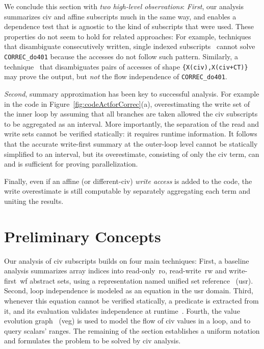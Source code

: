 \documentclass[10pt,nocopyrightspace]{sigplanconf}
\begin{document}
\vspace{1ex}
We conclude this section with {\em two high-level observations}: %
{\em First}, our analysis summarizes {\sc civ} and affine subscripts
much in the same way, and enables a dependence test that is agnostic
to the kind of subscripts that were used.
%
These properties do not seem to hold for related approaches: 
For example, techniques that disambiguate consecutively written,
single indexed subscripts~\cite{PaduaDemDrInterproc,VEG} cannot solve
{\tt CORREC\_do401} because the accesses do not follow such pattern.
Similarly, a technique~\cite{CohenBeyondMon} that disambiguates 
pairs of accesses of shape {\tt \{X(civ),X(civ+CT)\}} may prove the output,
but {\em not} the flow independence of {\tt CORREC\_do401}. 
%


{\em Second}, summary approximation has been key to successful
analysis. For example in the code in Figure~\ref{fig:codeActforCorrec}(a), 
overestimating the write set of the inner loop by assuming that all 
branches are taken allowed the {\sc civ} subscripts to be aggregated
as an interval. 
More importantly, the separation of the read and write sets cannot 
be verified statically: it requires runtime information. 
%
It follows that the accurate write-first summary at the 
outer-loop level cannot be statically simplified to an interval,
but its overestimate, consisting of only the {\sc civ} term, 
can and is sufficient for proving parallelization.

Finally, even if an affine (or different-{\sc civ})
{\em write access} is added to the code, the write overestimate
is still computable by separately aggregating each term and 
uniting the results.


\section{Preliminary Concepts}
\label{subsec:Background}


Our analysis of {\sc civ} subscripts builds on four main techniques: 
%
First, a baseline analysis summarizes array indices into read-only~{\sc ro}, 
read-write~{\sc rw} and write-first~{\sc wf} abstract sets, using a 
representation named unified set reference~\cite{HybAn} ({\sc usr}).
%
Second, loop independence is modeled as an equation in the 
{\sc usr} domain. 
%
Third, whenever this equation cannot be verified statically, a 
predicate is extracted from it, and its evaluation validates independence 
at runtime~\cite{CosPLDI}. 
%
Fourth, the value evolution graph~\cite{VEG} ({\sc veg}) is 
used to model the flow of {\sc civ} values in a loop, and to 
query scalars' ranges.
The remaining of the section establishes a uniform notation and 
formulates the problem to be solved by {\sc civ} analysis. 
\end{document}
